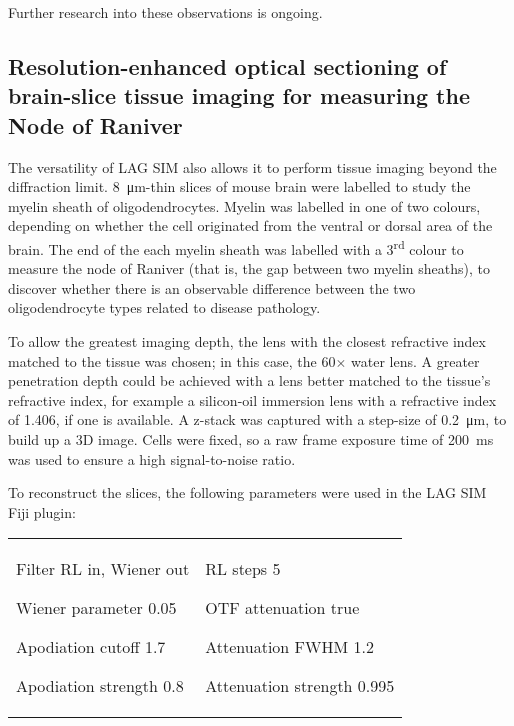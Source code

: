 Further research into these observations is ongoing. 


\subsection{Resolution-enhanced optical sectioning of brain-slice tissue imaging for measuring the Node of Raniver}
The versatility of LAG SIM also allows it to perform tissue imaging beyond the diffraction limit. 
\SI{8}{\micro\metre}-thin slices of mouse brain were labelled to study the myelin sheath of oligodendrocytes. 
Myelin was labelled in one of two colours, depending on whether the cell originated from the ventral or dorsal area of the brain. 
The end of the each myelin sheath was labelled with a 3\textsuperscript{rd} colour to measure the node of Raniver (that is, the gap between two myelin sheaths), to discover whether there is an observable difference between the two oligodendrocyte types related to disease pathology. 

To allow the greatest imaging depth, the lens with the closest refractive index matched to the tissue was chosen; in this case, the 60$\times$ water lens. 
A greater penetration depth could be achieved with a lens better matched to the tissue's refractive index, for example a silicon-oil immersion lens with a refractive index of \num{1.406}, if one is available. 
A z-stack was captured with a step-size of \SI{0.2}{\micro\metre}, to build up a 3D image. 
Cells were fixed, so a raw frame exposure time of \SI{200}{\milli\second} was used to ensure a high signal-to-noise ratio. 

To reconstruct the slices, the following parameters were used in the LAG SIM Fiji plugin:\newline
\begin{tabular}{p{}p{}}
\begin{labelling}[margin={Attenuation strength}]
	\item[Filter] RL in, Wiener out
	\item[Wiener parameter] 0.05
	\item[Apodiation cutoff] 1.7
	\item[Apodiation strength] 0.8
\end{labelling} &
\begin{labelling}[margin={Attenuation strength}]
	\item[RL steps] 5
	\item[OTF attenuation] true
	\item[Attenuation FWHM] 1.2
	\item[Attenuation strength] 0.995 
\end{labelling} %
\end{tabular}

